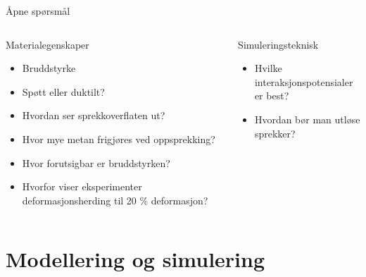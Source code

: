 \documentclass[utf8x, notes, graphics]{beamer}
\begin{document}
\begin{frame}{Åpne spørsmål}
\begin{columns}[T]
\begin{block}{Materialegenskaper}
\begin{itemize}
\item Bruddstyrke
\item Spøtt eller duktilt?
\item Hvordan ser sprekkoverflaten ut?
\item Hvor mye metan frigjøres ved oppsprekking?
\item Hvor forutsigbar er bruddstyrken?
\item Hvorfor viser eksperimenter deformasjonsherding til 20 \% deformasjon?
\end{itemize}
\end{block}
\begin{block}{Simuleringsteknisk}
\begin{itemize}
\item Hvilke interaksjonspotensialer er best?
\item Hvordan bør man utløse sprekker?
\end{itemize}
\end{block}
\end{columns}
\end{frame}

\section{Modellering og simulering}
\end{document}
